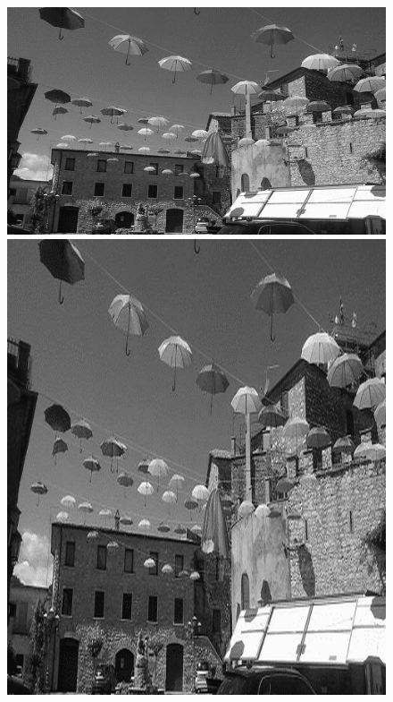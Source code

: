 \documentclass{article}
\begin{document}
	\begin{figure}[!ht]	
	\centering	
	\includegraphics[scale=0.7]{img/gray-obraz1}	
	\includegraphics[scale=0.7]{img/geometryczne/skalowanie_niejednorodne-gray}
	

\end{figure}
\end{document}
